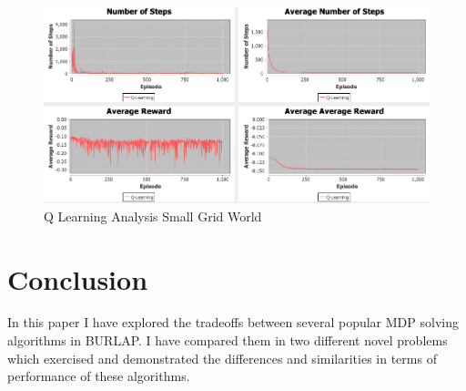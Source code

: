\documentclass[11pt]{article}
\newcommand{\problemone}{Small Grid World}
\begin{document}
    \begin{figure}
        \begin{minipage}{1\textwidth}
            \centering
            \includegraphics[width=1\linewidth]{qlearningdeepdive.png}
            \caption{Q Learning Analysis \problemone}\label{Fig:Q-Learning DD \problemone}
        \end{minipage}
    \end{figure}
    \section{Conclusion}
    In this paper I have explored the tradeoffs between several popular MDP solving algorithms in BURLAP.
    I have compared them in two different novel problems which exercised and demonstrated the differences and similarities
    in terms of performance of these algorithms.
    
    
\end{document}
